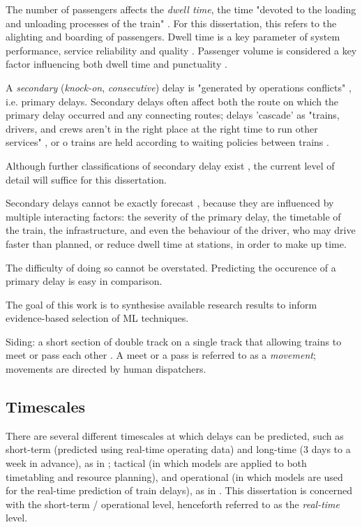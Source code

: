 \documentclass{article}
\begin{document}
The number of passengers affects the \textit{dwell time}, the time "devoted to the loading and unloading processes of the train" \cite{san_mohd_masirin_2016}. For this dissertation, this refers to the alighting
and boarding of passengers. Dwell time is a key parameter of system performance, service reliability and quality \cite{puong_2000}. Passenger volume is considered a key factor influencing both dwell time \cite{san_mohd_masirin_2016} and punctuality \cite{olsson_haugland_2004}.

A \textit{secondary} (\textit{knock-on}, \textit{consecutive}) delay is "generated by operations conflicts" \cite{cerreto_nielsen_harrod_nielsen_2016}, i.e. primary delays. Secondary delays often affect
both the route on which the primary delay occurred and any connecting routes; delays 'cascade' as "trains, drivers, and crews aren't in the right place at the right time to run other services" \cite{nr_knock_on_delays},
or o trains are held according to waiting policies between trains \cite{berger_et_al_2011}.

Although further classifications of secondary delay exist \cite{daamen_goverde_hansen_2008}, the current level of detail will suffice for this dissertation.

Secondary delays cannot be exactly forecast \cite{berger_et_al_2011}, \cite{milinkovic_markovic_veskovic_ivic_pavlovic_2013} because they are influenced by multiple interacting factors: the severity of the primary delay, the timetable of the train, the infrastructure, and even the behaviour of the driver, who may drive faster than planned, or reduce dwell time at stations, in order to make up time.

The difficulty of doing so cannot be overstated. Predicting the occurence of a primary delay is easy in comparison.

The goal of this work is to synthesise available research results to inform evidence-based selection of ML techniques.

Siding: a short section of double track on a single track that allowing trains to meet or pass each other \cite{barbour_et_al_2019}. A meet or a pass is referred to as a \textit{movement}; movements are directed by human dispatchers. 

\subsection{Timescales}

There are several different timescales at which delays can be predicted, such as short-term (predicted using real-time operating data) and long-time (3 days to a week in advance), as in \cite{wang_zhang_2019};
tactical (in which models are applied to both timetabling and resource planning), and operational (in which models are used for the real-time prediction of train delays), as in \cite{markovic_milinkovic_tikhonov_schonfeld_2015}. This dissertation is concerned with the short-term / operational level, henceforth referred to as the \textit{real-time} level. 
\end{document}
